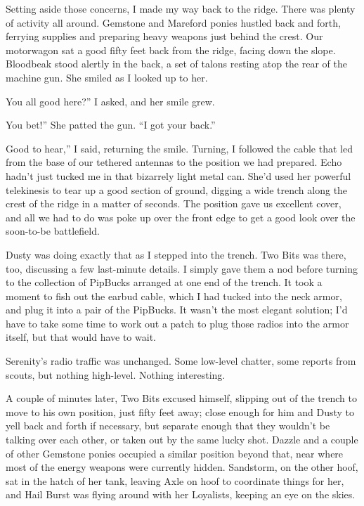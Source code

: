 Setting aside those concerns, I made my way back to the ridge. There was plenty of activity all around. Gemstone and Mareford ponies hustled back and forth, ferrying supplies and preparing heavy weapons just behind the crest. Our motorwagon sat a good fifty feet back from the ridge, facing down the slope. Bloodbeak stood alertly in the back, a set of talons resting atop the rear of the machine gun. She smiled as I looked up to her.

\leavevmode{}You all good here?” I asked, and her smile grew.

\leavevmode{}You bet!” She patted the gun. “I got your back.”

\leavevmode{}Good to hear,” I said, returning the smile. Turning, I followed the cable that led from the base of our tethered antennas to the position we had prepared. Echo hadn’t just tucked me in that bizarrely light metal can. She’d used her powerful telekinesis to tear up a good section of ground, digging a wide trench along the crest of the ridge in a matter of seconds. The position gave us excellent cover, and all we had to do was poke up over the front edge to get a good look over the soon-to-be battlefield.

Dusty was doing exactly that as I stepped into the trench. Two Bits was there, too, discussing a few last-minute details. I simply gave them a nod before turning to the collection of PipBucks arranged at one end of the trench. It took a moment to fish out the earbud cable, which I had tucked into the neck armor, and plug it into a pair of the PipBucks. It wasn’t the most elegant solution; I’d have to take some time to work out a patch to plug those radios into the armor itself, but that would have to wait.

Serenity’s radio traffic was unchanged. Some low-level chatter, some reports from scouts, but nothing high-level. Nothing interesting.

A couple of minutes later, Two Bits excused himself, slipping out of the trench to move to his own position, just fifty feet away; close enough for him and Dusty to yell back and forth if necessary, but separate enough that they wouldn’t be talking over each other, or taken out by the same lucky shot. Dazzle and a couple of other Gemstone ponies occupied a similar position beyond that, near where most of the energy weapons were currently hidden. Sandstorm, on the other hoof, sat in the hatch of her tank, leaving Axle on hoof to coordinate things for her, and Hail Burst was flying around with her Loyalists, keeping an eye on the skies.

